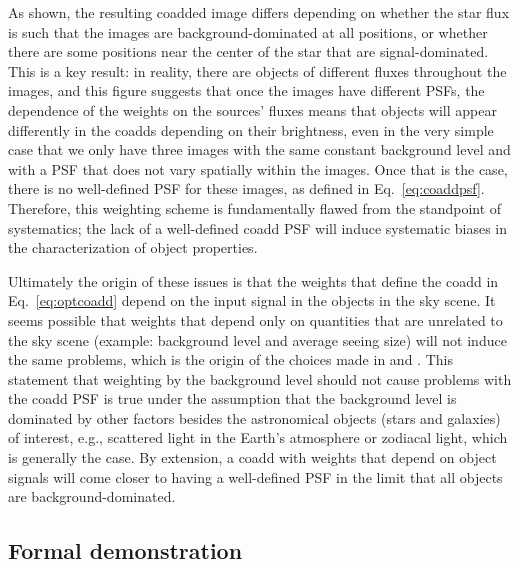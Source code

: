 \documentclass{openjournal}
\newcommand{\irresponse}[1]{{#1}}
\newcommand{\refresponse}[1]{#1}
\begin{document}
As shown, the resulting coadded image differs depending on whether the star flux is such that the images are background-dominated at all positions, or whether there are some positions near the center of the star that are signal-dominated.  This is a key result: in reality, there are objects of different fluxes throughout the images, and this figure suggests that once the images have different PSFs, the dependence of the weights on the \irresponse{sources' fluxes} means that objects will appear differently in the coadds depending on their brightness, even in the very simple case that we only have \irresponse{three} images with the same constant background level and with a PSF that does not vary spatially within the images.  Once that is the case, there is no well-defined PSF for these images, as defined in Eq.~\eqref{eq:coaddpsf}.  Therefore, \refresponse{this weighting scheme is} fundamentally flawed from the standpoint of systematics; the lack of a well-defined coadd PSF will induce systematic biases in the characterization of object properties.

Ultimately the origin of these issues is that the weights that define the coadd in Eq.~\eqref{eq:optcoadd} depend on the input signal in the objects in the sky scene.  It seems possible that weights that depend only on quantities that are unrelated to the sky scene (example: background level and average seeing size) will not induce the same problems, which is the origin of the choices made in \citet{2014ApJ...794..120A} and \citet{2017ApJ...836..187Z}.  \irresponse{This statement that weighting by the background level should not cause problems with the coadd PSF is true under the assumption that the background level is dominated by other factors besides the astronomical objects (stars and galaxies) of interest, e.g., scattered light in the Earth's atmosphere or zodiacal light, which is generally the case.} By extension, a coadd with weights that depend on object signals will come closer to having a well-defined PSF in the limit that all objects are background-dominated.

 \subsection{Formal demonstration}\label{subsec:formal}
\end{document}
